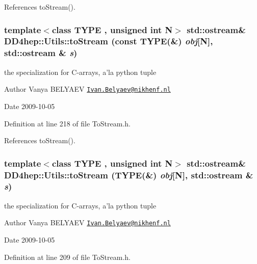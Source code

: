 References toStream().\hypertarget{namespace_d_d4hep_1_1_utils_a185388ab1fc3cea027102d8da59b4d06}{
\subsubsection[{toStream}]{\setlength{\rightskip}{0pt plus 5cm}template$<$class TYPE , unsigned int N$>$ std::ostream\& DD4hep::Utils::toStream (const TYPE(\&) {\em obj}\mbox{[}N\mbox{]}, \/  std::ostream \& {\em s})}}
\label{namespace_d_d4hep_1_1_utils_a185388ab1fc3cea027102d8da59b4d06}
the specialization for C-\/arrays, a'la python tuple \begin{DoxyAuthor}{Author}
Vanya BELYAEV \href{mailto:Ivan.Belyaev@nikhenf.nl}{\tt Ivan.Belyaev@nikhenf.nl} 
\end{DoxyAuthor}
\begin{DoxyDate}{Date}
2009-\/10-\/05 
\end{DoxyDate}


Definition at line 218 of file ToStream.h.

References toStream().\hypertarget{namespace_d_d4hep_1_1_utils_a17b02e5ffc5536d55bdb8ff38a938543}{
\subsubsection[{toStream}]{\setlength{\rightskip}{0pt plus 5cm}template$<$class TYPE , unsigned int N$>$ std::ostream\& DD4hep::Utils::toStream (TYPE(\&) {\em obj}\mbox{[}N\mbox{]}, \/  std::ostream \& {\em s})}}
\label{namespace_d_d4hep_1_1_utils_a17b02e5ffc5536d55bdb8ff38a938543}
the specialization for C-\/arrays, a'la python tuple \begin{DoxyAuthor}{Author}
Vanya BELYAEV \href{mailto:Ivan.Belyaev@nikhenf.nl}{\tt Ivan.Belyaev@nikhenf.nl} 
\end{DoxyAuthor}
\begin{DoxyDate}{Date}
2009-\/10-\/05 
\end{DoxyDate}


Definition at line 209 of file ToStream.h.

